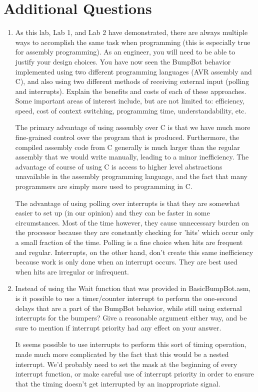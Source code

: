 \documentclass[12pt,letterpaper]{article}
\begin{document}
\section{Additional Questions}
\begin{enumerate}
    \item
    As this lab, Lab 1, and Lab 2 have demonstrated, there are always multiple
    ways to accomplish the same task when programming (this is especially
    true for assembly programming). As an engineer, you will need to be able
    to justify your design choices. You have now seen the BumpBot behavior
    implemented using two different programming languages (AVR assembly
    and C), and also using two different methods of receiving external input
    (polling and interrupts).
    Explain the benefits and costs of each of these approaches. Some important
    areas of interest include, but are not limited to: efficiency, speed, cost of
    context switching, programming time, understandability, etc.

	The primary advantage of using assembly over C is that we have much more fine-grained control over the program that is produced. Furthermore, the compiled assembly code from C generally is much larger than the regular assembly that we would write manually, leading to a minor inefficiency. The advantage of course of using C is access to higher level abstractions unavailable in the assembly programming language, and the fact that many programmers are simply more used to programming in C.
	
	The advantage of using polling over interrupts is that they are somewhat easier to set up (in our opinion) and they can be faster in some circumstances. Most of the time however, they cause unnecessary burden on the processor because they are constantly checking for 'hits' which occur only a small fraction of the time. Polling is a fine choice when hits are frequent and regular. Interrupts, on the other hand, don't create this same inefficiency because work is only done when an interrupt occurs. They are best used when hits are irregular or infrequent.
	
	\item
	Instead of using the Wait function that was provided in BasicBumpBot.asm,
	is it possible to use a timer/counter interrupt to perform the one-second
	delays that are a part of the BumpBot behavior, while still using external
	interrupts for the bumpers? Give a reasonable argument either way, and be
	sure to mention if interrupt priority had any effect on your answer.
	
	It seems possible to use interrupts to perform this sort of timing operation, made much more complicated by the fact that this would be a nested interrupt. We'd probably need to set the mask at the beginning of every interrupt function, or make careful use of interrupt priority in order to ensure that the timing doesn't get interrupted by an inappropriate signal.

\end{enumerate}
\end{document}

